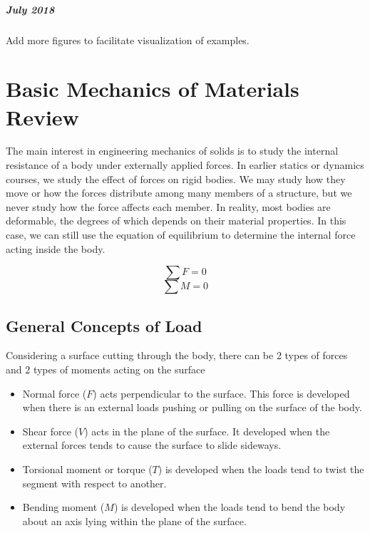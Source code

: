 \documentclass[
10pt,
a4paper,
openany,
svgnames,
]{book} %
\begin{document}
\paragraph{July 2018}

Add more figures to facilitate visualization of examples. 

\tableofcontents

\listoffigures

\listoftables

\mainmatter


\chapter{Basic Mechanics of Materials Review}

The main interest in engineering mechanics of solids is to study the internal resistance of a body under externally applied forces. In earlier statics or dynamics courses, we study the effect of forces on rigid bodies. We may study how they move or how the forces distribute among many members of a structure, but we never study how the force affects each member. In reality, most bodies are deformable, the degrees of which depends on their material properties. In this case, we can still use the equation of equilibrium to determine the internal force acting inside the body.

$$ \sum F = 0 $$
$$ \sum M = 0 $$

\section{General Concepts of Load}

Considering a surface cutting through the body, there can be 2 types of forces and 2 types of moments acting on the surface

\begin{itemize}
\item Normal force ($F$) acts perpendicular to the surface. This force is developed when there is an external loads pushing or pulling on the surface of the body.
\item Shear force ($V$) acts in the plane of the surface. It developed when the external forces tends to cause the surface to slide sideways.
\item Torsional moment or torque ($T$) is developed when the loads tend to twist the segment with respect to another.
\item Bending moment ($M$) is developed when the loads tend to bend the body about an axis lying within the plane of the surface.
\end{itemize}
\end{document}
